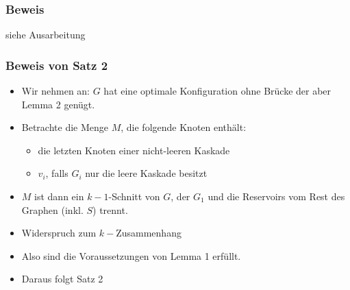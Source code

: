 \documentclass{beamer}
\theoremstyle{definition}
\theoremstyle{plain}
\begin{document}
\begin{frame}
\frametitle{Beweis}
siehe Ausarbeitung
\end{frame}
\begin{frame}
\frametitle{Beweis von Satz 2}
\begin{itemize}
\item Wir nehmen an: $G$ hat eine optimale Konfiguration ohne Brücke der aber Lemma 2 genügt.
\item Betrachte die Menge $M$, die folgende Knoten enthält:
\begin{itemize}
\item die letzten Knoten einer nicht-leeren Kaskade
\item $v_i$, falls $G_i$ nur die leere Kaskade besitzt
\end{itemize}
\item $M$ ist dann ein $k-1$-Schnitt von $G$, der $G_1$ und die Reservoirs vom Rest des Graphen (inkl. $S$) trennt.
\item Widerspruch zum $k-$Zusammenhang
\item Also sind die Voraussetzungen von Lemma 1 erfüllt.
\item Daraus folgt Satz 2
\end{itemize}
\end{frame}
\end{document}
